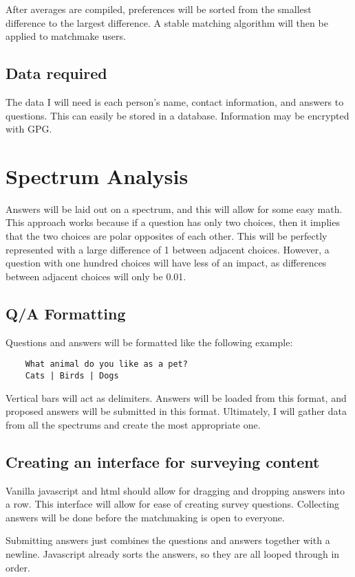 \documentclass[12pt]{article}
\begin{document}
After averages are compiled, preferences will be sorted from the smallest
difference to the largest difference. A stable matching algorithm will then be
applied to matchmake users.

\subsection{Data required}
The data I will need is each person's name, contact information, and answers to
questions. This can easily be stored in a database. Information may be encrypted
with GPG.

\section{Spectrum Analysis}
Answers will be laid out on a spectrum, and this will allow for some easy math.
This approach works because if a question has only two choices, then it implies
that the two choices are polar opposites of each other. This will be perfectly
represented with a large difference of 1 between adjacent choices. However, a
question with one hundred choices will have less of an impact, as differences
between adjacent choices will only be 0.01.

\subsection{Q/A Formatting}
Questions and answers will be formatted like the following example:

\begin{verbatim}
    What animal do you like as a pet?
    Cats | Birds | Dogs
\end{verbatim}

Vertical bars will act as delimiters. Answers will be loaded from this format,
and proposed answers will be submitted in this format. Ultimately, I will gather
data from all the spectrums and create the most appropriate one.

\subsection{Creating an interface for surveying content}
Vanilla javascript and html should allow for dragging and dropping answers into
a row. This interface will allow for ease of creating survey questions.
Collecting answers will be done before the matchmaking is open to everyone.

Submitting answers just combines the questions and answers together with a
newline. Javascript already sorts the answers, so they are all looped through in
order.
\end{document}
